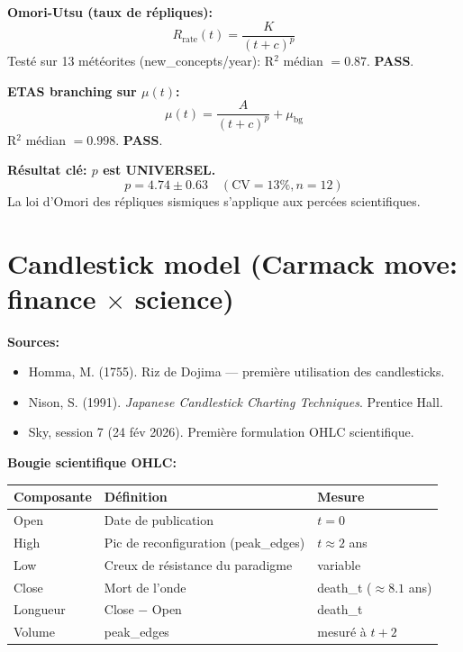 \documentclass[11pt,a4paper]{article}
\begin{document}
\textbf{Omori-Utsu (taux de r\'epliques):}
\begin{equation}
\boxed{R_{\text{rate}}(t) = \frac{K}{(t + c)^p}}
\end{equation}
Test\'e sur 13 m\'et\'eorites (new\_concepts/year): R$^2$ m\'edian $= 0.87$. \textbf{PASS}.

\textbf{ETAS branching sur $\mu(t)$:}
\begin{equation}
\mu(t) = \frac{A}{(t + c)^p} + \mu_{\text{bg}}
\end{equation}
R$^2$ m\'edian $= 0.998$. \textbf{PASS}.

\textbf{R\'esultat cl\'e: $p$ est UNIVERSEL.}
\begin{equation}
p = 4.74 \pm 0.63 \quad (\text{CV} = 13\%, n = 12)
\end{equation}
La loi d'Omori des r\'epliques sismiques s'applique aux perc\'ees scientifiques.

\section{Candlestick model (Carmack move: finance $\times$ science)}

\textbf{Sources:}
\begin{itemize}
\item Homma, M. (1755). Riz de Dojima --- premi\`ere utilisation des candlesticks.
\item Nison, S. (1991). \textit{Japanese Candlestick Charting Techniques}. Prentice Hall.
\item Sky, session 7 (24 f\'ev 2026). Premi\`ere formulation OHLC scientifique.
\end{itemize}

\textbf{Bougie scientifique OHLC:}
\begin{center}
\begin{tabular}{lll}
\toprule
\textbf{Composante} & \textbf{D\'efinition} & \textbf{Mesure} \\
\midrule
Open & Date de publication & $t = 0$ \\
High & Pic de reconfiguration (peak\_edges) & $t \approx 2$ ans \\
Low & Creux de r\'esistance du paradigme & variable \\
Close & Mort de l'onde & death\_t ($\approx 8.1$ ans) \\
Longueur & Close $-$ Open & death\_t \\
Volume & peak\_edges & mesur\'e \`a $t+2$ \\
\bottomrule
\end{tabular}
\end{center}
\end{document}
